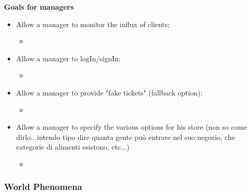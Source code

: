 \textbf{Goals for managers}
\begin{itemize}
    \item Allow a manager to monitor the influx of clients;
        \begin{itemize}
            \item 
        \end{itemize}
    \item Allow a manager to logIn/signIn;
        \begin{itemize}
            \item 
        \end{itemize}
    \item Allow a manager to provide "fake tickets" (fallback option);
        \begin{itemize}
            \item 
        \end{itemize}
    \item Allow a manager to specify the various options for his store (non so come dirlo.. intendo tipo dire quanta gente può entrare nel suo negozio, che categorie di alimenti esistono, etc...)
        \begin{itemize}
            \item 
        \end{itemize}
\end{itemize}
\subsubsection{World Phenomena}
